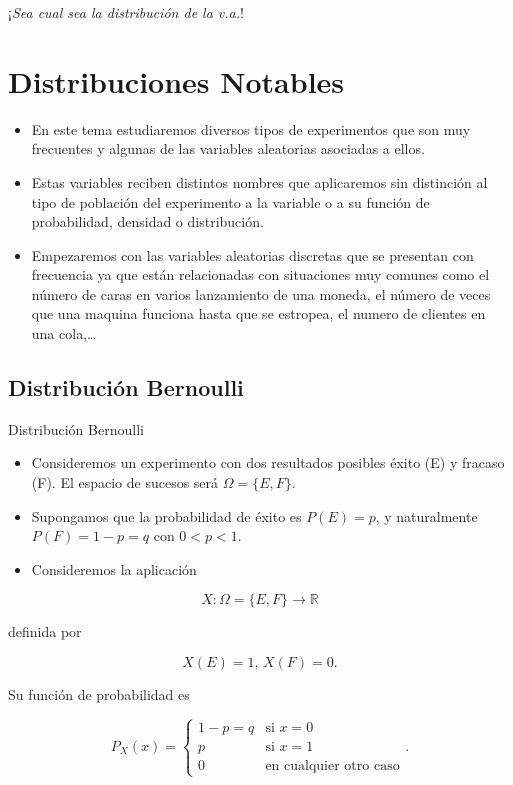 \documentclass[]{book}
\providecommand{\tightlist}{%
  \setlength{\itemsep}{0pt}\setlength{\parskip}{0pt}}
\begin{document}
¡\emph{Sea cual sea la distribución de la v.a.}!

\hypertarget{distribuciones-notables}{%
\chapter{Distribuciones Notables}\label{distribuciones-notables}}

\begin{itemize}
\item
  En este tema estudiaremos diversos tipos de experimentos que son muy frecuentes y algunas de las variables aleatorias asociadas a ellos.
\item
  Estas variables reciben distintos nombres que aplicaremos sin distinción al tipo de población del experimento a la variable o a su función de probabilidad, densidad o distribución.
\item
  Empezaremos con las variables aleatorias discretas que se presentan con frecuencia ya que están relacionadas con situaciones muy comunes como el número de caras en varios lanzamiento de una moneda, el número de veces que una maquina funciona hasta que se estropea, el numero de clientes en una cola,\ldots{}
\end{itemize}

\hypertarget{distribuciuxf3n-bernoulli}{%
\section{Distribución Bernoulli}\label{distribuciuxf3n-bernoulli}}

 Distribución Bernoulli

\begin{itemize}
\tightlist
\item
  Consideremos un experimento con dos resultados posibles éxito (E) y
  fracaso (F). El espacio de sucesos será \(\Omega=\{E,F\}\).
\item
  Supongamos que la probabilidad de éxito es \(P(E)=p\), y naturalmente \(P(F)=1-p=q\) con \(0<p<1\).
\item
  Consideremos la aplicación
\end{itemize}

\[
X:\Omega=\{E,F\}\to \mathbb{R}
\]

definida por

\[
X(E)=1\mbox{, }X(F)=0.
\]

Su función de probabilidad es

\[
P_{X}(x)=
\left\{
\begin{array}{ll} 1-p=q & \mbox{si } x=0\\
p & \mbox{si } x=1\\
0 & \mbox{en cualquier otro caso}
\end{array}
\right..
\]
\end{document}
